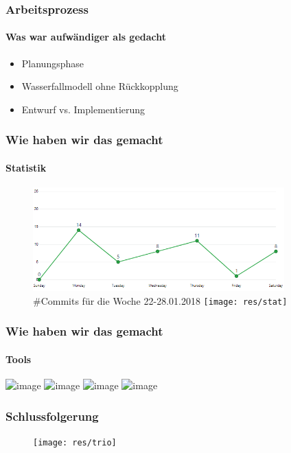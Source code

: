 \documentclass{beamer}
\begin{document}
\begin{frame}
\frametitle{Arbeitsprozess}
\framesubtitle{Was war aufwändiger als gedacht}
\begin{itemize}
	\item<1-3> Planungsphase
	\item<2-3> Wasserfallmodell ohne Rückkopplung
	\item<3> Entwurf vs. Implementierung
\end{itemize}
\end{frame}

\begin{frame}
	
	\frametitle{Wie haben wir das gemacht}
	\framesubtitle{Statistik}
	\begin{figure}
		
		\includegraphics[width=.8\textwidth, height = 4cm]{res/git_stat}\newline \vspace{0.3cm}
		\#Commits für die Woche 22-28.01.2018
		\texttt{[image: res/stat]}
	\end{figure}
	
\end{frame}
\begin{frame}
	\frametitle{Wie haben wir das gemacht}
	\framesubtitle{Tools}
	\includegraphics<1>[width=6.7cm, height=3.2cm]{res/tools1}
	\includegraphics<2>[width=\textwidth]{res/tools2}
	\includegraphics<3>[width=\textwidth]{res/tools3}
	\includegraphics<4>[width=\textwidth]{res/tools4}
\end{frame}
\begin{frame}
\frametitle{Schlussfolgerung}
	
\begin{figure}
\texttt{[image: res/trio]}
\end{figure}
\end{frame}

\end{document}
